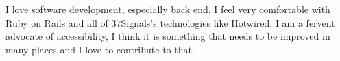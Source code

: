 

\begin{cvparagraph}

I love software development, especially back end. I feel very comfortable with Ruby on Rails and all of 37Signals's technologies like Hotwired. I am a fervent advocate of accessibility, I think it is something that needs to be improved in many places and I love to contribute to that.
\end{cvparagraph}
